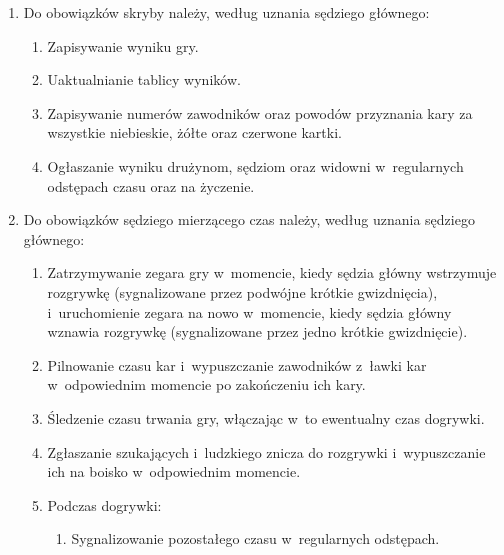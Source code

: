 \documentclass[12pt]{article}
\begin{document}
\begin{enumerate}
	\item
	      Do obowiązków skryby należy, według uznania sędziego głównego:

	      \begin{enumerate}
		      \item
		            Zapisywanie wyniku gry.
		      \item
		            Uaktualnianie tablicy wyników.
		      \item
		            Zapisywanie numerów zawodników oraz powodów przyznania kary za
		            wszystkie niebieskie, żółte oraz czerwone kartki.
		      \item
		            Ogłaszanie wyniku drużynom, sędziom oraz widowni w~regularnych
		            odstępach czasu oraz na życzenie.
	      \end{enumerate}
	\item
	      Do obowiązków sędziego mierzącego czas należy, według uznania sędziego
	      głównego:

	      \begin{enumerate}
		      \item
		            Zatrzymywanie zegara gry w~momencie, kiedy sędzia główny wstrzymuje
		            rozgrywkę (sygnalizowane przez podwójne krótkie gwizdnięcia), i~uruchomienie zegara na nowo w~momencie, kiedy sędzia główny wznawia
		            rozgrywkę (sygnalizowane przez jedno krótkie gwizdnięcie).
		      \item
		            Pilnowanie czasu kar i~wypuszczanie zawodników z~ławki kar w~odpowiednim momencie po zakończeniu ich kary.
		      \item
		            Śledzenie czasu trwania gry, włączając w~to ewentualny czas
		            dogrywki.
		      \item
		            Zgłaszanie szukających i~ludzkiego znicza do rozgrywki i~wypuszczanie ich na boisko w~odpowiednim momencie.
		      \item
		            Podczas dogrywki:

		            \begin{enumerate}
			            \item
			                  Sygnalizowanie pozostałego czasu w~regularnych odstępach.


\end{enumerate}
\end{enumerate}
\end{enumerate}
\end{document}
